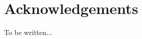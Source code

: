 {%
\let\oldnumberline\numberline%
\renewcommand{\numberline}{\figurename~\oldnumberline}%
\listoffigures%
}

\cleardoublepage



\chapter{Acknowledgements}      %
To be written...
